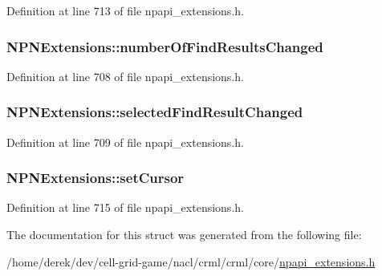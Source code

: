 Definition at line 713 of file npapi\_\-extensions.h.

\hypertarget{struct_n_p_n_extensions_ad74b140a965a2dbade0cd188e3585d29}{
\subsubsection[{numberOfFindResultsChanged}]{ {\bf NPNExtensions::numberOfFindResultsChanged}}}
\label{struct_n_p_n_extensions_ad74b140a965a2dbade0cd188e3585d29}


Definition at line 708 of file npapi\_\-extensions.h.

\hypertarget{struct_n_p_n_extensions_aa1be39296fd71b183738a876c59bc4a9}{
\subsubsection[{selectedFindResultChanged}]{ {\bf NPNExtensions::selectedFindResultChanged}}}
\label{struct_n_p_n_extensions_aa1be39296fd71b183738a876c59bc4a9}


Definition at line 709 of file npapi\_\-extensions.h.

\hypertarget{struct_n_p_n_extensions_a9e7532a93dcb451d4591b263dd7a42c3}{
\subsubsection[{setCursor}]{ {\bf NPNExtensions::setCursor}}}
\label{struct_n_p_n_extensions_a9e7532a93dcb451d4591b263dd7a42c3}


Definition at line 715 of file npapi\_\-extensions.h.



The documentation for this struct was generated from the following file:\begin{DoxyCompactItemize}
\item 
/home/derek/dev/cell-\/grid-\/game/nacl/crml/crml/core/\hyperlink{npapi__extensions_8h}{npapi\_\-extensions.h}\end{DoxyCompactItemize}
